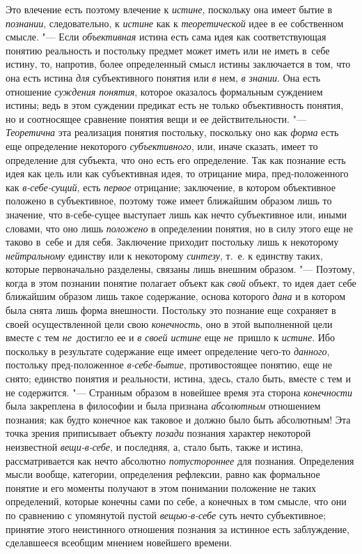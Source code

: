 Это влечение есть поэтому влечение к {\em истине}, поскольку
она имеет бытие в {\em познании}, следовательно, к {\em истине} как к
{\em теоретической} идее в ее собственном смысле. "--- Если
{\em объективная} истина
есть сама идея как соответствующая понятию реальность и постольку предмет
может иметь или не иметь в~себе истину, то, напротив, более определенный
смысл истины заключается в том, что она есть истина
{\em для} субъективного понятия или {\em в} нем, {\em в знании}. Она есть
отношение {\em суждения понятия},
которое оказалось формальным суждением истины; ведь в этом
суждении предикат есть не только объективность понятия, но и соотносящее
сравнение понятия вещи и ее действительности. "---
{\em Теоретична} эта реализация понятия постольку, поскольку оно как
{\em форма} есть еще определение некоторого {\em субъективного}, или,
иначе сказать, имеет то определение для субъекта, что оно есть его
определение. Так как познание есть идея как цель или как субъективная идея,
то отрицание мира, пред-положенного как {\em в-себе-сущий}, есть
{\em первое} отрицание;
заключение, в котором объективное положено в субъективное, поэтому тоже
имеет ближайшим образом лишь то значение, что в-себе-сущее выступает лишь
как нечто субъективное или, иными словами, что оно лишь
{\em положено} в
определении понятия, но в силу этого еще не таково в~себе и для себя.
Заключение приходит постольку лишь к некоторому
{\em нейтральному} единству или к некоторому {\em синтезу}, т.~е. к
единству таких, которые первоначально разделены, связаны лишь внешним
образом. "--- Поэтому, когда в этом познании понятие полагает
объект как {\em свой}
объект, то идея дает себе ближайшим образом лишь такое
содержание, основа которого {\em дана}
и в котором была снята лишь форма внешности. Постольку это
познание еще сохраняет в своей осуществленной цели свою
{\em конечность}, оно в этой выполненной цели вместе с тем
{\em не}~достигло ее и {\em в своей истине} еще
{\em не}~пришло к {\em истине}. Ибо
поскольку в результате содержание еще имеет определение чего-то
{\em данного}, постольку
пред-положенное {\em в-себе-бытие},
противостоящее понятию, еще не снято; единство понятия и
реальности, истина, здесь, стало быть, вместе с тем и не содержится. "---
Странным образом в новейшее время эта сторона {\em конечности} была
закреплена в философии и была признана {\em абсолютным} отношением
познания;
как будто конечное как таковое и должно было быть абсолютным!
Эта точка зрения приписывает объекту {\em позади} познания
характер некоторой неизвестной {\em вещи-в-себе}, и
последняя, а, стало быть, также и истина, рассматривается
как нечто абсолютно {\em потустороннее}
для познания. Определения мысли вообще, категории,
определения рефлексии, равно как формальное понятие и его моменты получают
в этом понимании положение не таких определений, которые конечны сами по
себе, а конечных в том смысле, что они по сравнению с упомянутой пустой
{\em вещью-в-себе} суть
нечто субъективное; принятие этого неистинного отношения познания за
истинное есть заблуждение, сделавшееся всеобщим мнением новейшего времени.

